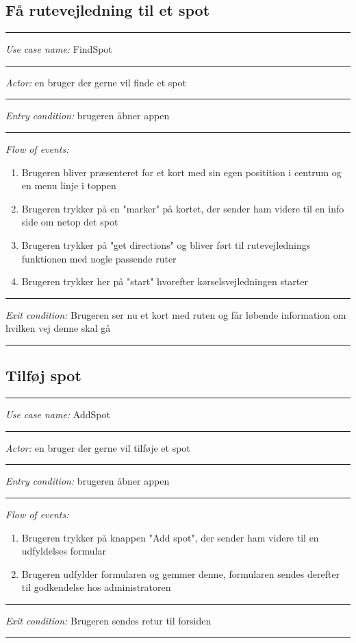 \documentclass[12pt]{article}
\begin{document}
\subsection*{Få rutevejledning til et spot}
\hrule\vspace{5mm}
\textit{Use case name:} FindSpot\\
\hrule\vspace{5mm}
\textit{Actor:} en bruger der gerne vil finde et spot\\
\hrule\vspace{5mm}
\textit{Entry condition:} brugeren åbner appen\\
\hrule\vspace{5mm}
\textit{Flow of events:}
\begin{enumerate}
\item Brugeren bliver præsenteret for et kort med sin egen positition i centrum og en menu linje i toppen
\item Brugeren trykker på en "marker" på kortet, der sender ham videre til en info side om netop det spot
\item Brugeren trykker på "get directions" og bliver ført til rutevejlednings funktionen med nogle passende ruter
\item Brugeren trykker her på "start" hvorefter kørselsvejledningen starter
\end{enumerate}
\hrule\vspace{5mm}
\textit{Exit condition:} Brugeren ser nu et kort med ruten og får løbende information om hvilken vej denne skal gå\\
\hrule\vspace{5mm}
\newpage
\subsection*{Tilføj spot}
\hrule\vspace{5mm}
\textit{Use case name:} AddSpot\\
\hrule\vspace{5mm}
\textit{Actor:} en bruger der gerne vil tilføje et spot\\
\hrule\vspace{5mm}
\textit{Entry condition:} brugeren åbner appen\\
\hrule\vspace{5mm}
\textit{Flow of events:}
\begin{enumerate}
\item Brugeren trykker på knappen "Add spot", der sender ham videre til en udfyldelses formular
\item Brugeren udfylder formularen og gemmer denne, formularen sendes derefter til godkendelse hos administratoren
\end{enumerate}
\hrule\vspace{5mm}
\textit{Exit condition:} Brugeren sendes retur til forsiden\\
\hrule\vspace{5mm}
\newpage
\end{document}
